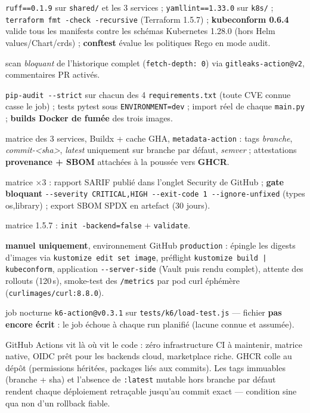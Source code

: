 \documentclass[11pt,a4paper]{article}
\begin{document}
\begin{description}[itemsep=2pt,leftmargin=1.4em]
  \item[lint] \texttt{ruff==0.1.9} sur \texttt{shared/} et les 3 services ; \texttt{yamllint==1.33.0} sur \texttt{k8s/} ; \texttt{terraform fmt -check -recursive} (Terraform 1.5.7) ; \textbf{kubeconform 0.6.4} valide tous les manifests contre les schémas Kubernetes 1.28.0 (hors Helm values/Chart/crds) ; \textbf{conftest} évalue les politiques Rego en mode audit.
  \item[gitleaks] scan \emph{bloquant} de l'historique complet (\texttt{fetch-depth: 0}) via \texttt{gitleaks-action@v2}, commentaires PR activés.
  \item[test] \texttt{pip-audit -{}-strict} sur chacun des 4 \texttt{requirements.txt} (toute CVE connue casse le job) ; tests pytest sous \texttt{ENVIRONMENT=dev} ; import réel de chaque \texttt{main.py} ; \textbf{builds Docker de fumée} des trois images.
  \item[build] matrice des 3 services, Buildx + cache GHA, \texttt{metadata-action} : tags \emph{branche}, \emph{commit-<sha>}, \emph{latest} uniquement sur branche par défaut, \emph{semver} ; attestations \textbf{provenance + SBOM} attachées à la poussée vers \textbf{GHCR}.
  \item[trivy-scan] matrice ×3 : rapport SARIF publié dans l'onglet Security de GitHub ; \textbf{gate bloquant} \texttt{-{}-severity CRITICAL,HIGH -{}-exit-code 1 -{}-ignore-unfixed} (types os,library) ; export SBOM SPDX en artefact (30 jours).
  \item[terraform-validate] matrice 1.5.7 : \texttt{init -backend=false} + \texttt{validate}.
  \item[deploy] \textbf{manuel uniquement}, environnement GitHub \texttt{production} : épingle les digests d'images via \texttt{kustomize edit set image}, préflight \texttt{kustomize build | kubeconform}, application \texttt{-{}-server-side} (Vault puis rendu complet), attente des rollouts (120\,s), smoke-test des \texttt{/metrics} par pod curl éphémère (\texttt{curlimages/curl:8.8.0}).
  \item[load-test] job nocturne \texttt{k6-action@v0.3.1} sur \texttt{tests/k6/load-test.js} --- fichier \textbf{pas encore écrit} : le job échoue à chaque run planifié (lacune connue et assumée).
\end{description}

\begin{whybox}
GitHub Actions vit là où vit le code : zéro infrastructure CI à maintenir, matrice native, OIDC prêt pour les backends cloud, marketplace riche. GHCR colle au dépôt (permissions héritées, packages liés aux commits). Les tags immuables (branche + sha) et l'absence de \texttt{:latest} mutable hors branche par défaut rendent chaque déploiement retraçable jusqu'au commit exact --- condition sine qua non d'un rollback fiable.
\end{whybox}
\end{document}

